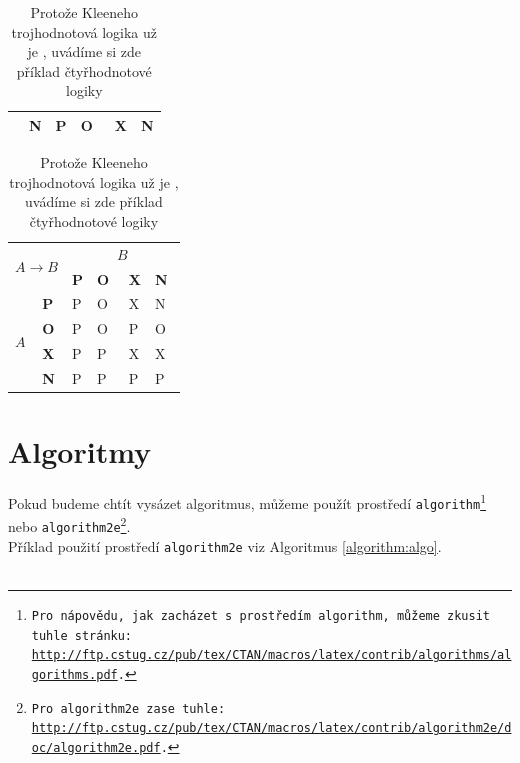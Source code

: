 \documentclass[a4paper, 11pt]{article}
\begin{document}
\begin{table}[h]
\begin{tabular}{|l|l|l|l|l|l|}
                        & \textbf{N}      & P           & O~& X           & N           \\ \hline
\end{tabular}
\begin{tabular}{|l|l|l|l|l|l|}
\hline
\multicolumn{2}{|c|}{\multirow{2}{*}{$A \rightarrow B$}} & \multicolumn{4}{c|}{$B$}                            \\ \cline{3-6} 
\multicolumn{2}{|c|}{}                    & \textbf{P} & \textbf{O} & \textbf{X} & \textbf{N} \\ \hline
\multirow{4}{*}{$A$}      & \textbf{P}      & P           & O~& X           & N           \\ \cline{2-6} 
                        & \textbf{O}      & P           & O~& P           & O~\\ \cline{2-6} 
                        & \textbf{X}      & P           & P           & X           & X           \\ \cline{2-6} 
                        & \textbf{N}      & P           & P           & P           & P           \\ \hline
\end{tabular}
\caption{\label{table:tab2}Protože Kleeneho trojhodnotová logika už je , uvádíme si zde příklad čtyřhodnotové logiky}
\end{table}
\bigskip
\pagebreak
\section{Algoritmy}
\label{section:algos}
Pokud budeme chtít vysázet algoritmus, můžeme použít prostředí \texttt{algorithm\footnote{Pro nápovědu, jak zacházet s~prostředím \texttt{algorithm,} můžeme zkusit tuhle stránku:\\
\href{http://ftp.cstug.cz/pub/tex/CTAN/macros/latex/contrib/algorithms/algorithms.pdf}{http://ftp.cstug.cz/pub/tex/CTAN/macros/latex/contrib/algorithms/algorithms.pdf}.}} nebo \texttt{algorithm2e\footnote{Pro \texttt{algorithm2e} zase tuhle: \href{http://ftp.cstug.cz/pub/tex/CTAN/macros/latex/contrib/algorithm2e/doc/algorithm2e.pdf}{http://ftp.cstug.cz/pub/tex/CTAN/macros/latex/contrib/algorithm2e/doc/algorithm2e.pdf}.}}.
\\ Příklad použití prostředí \texttt{algorithm2e} viz Algoritmus \ref{algorithm:algo}.\\~\\
\end{document}
